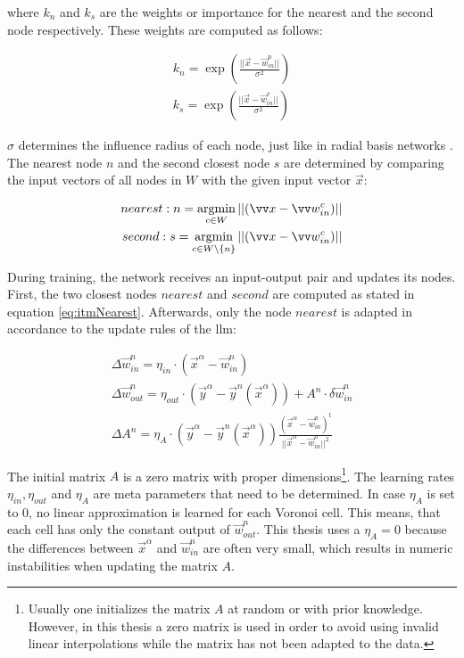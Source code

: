 where $k_n$ and $k_s$ are the weights or importance for the nearest and the second node respectively. These weights are computed as follows:

\begin{equation}
\begin{split}
k_n = \exp\left(\frac{||\vec{x}-\vec{w}^n_{in}||}{\sigma^2}\right) \\
k_s = \exp\left(\frac{||\vec{x}-\vec{w}^s_{in}||}{\sigma^2}\right) 
\end{split}
\end{equation}

$\sigma$ determines the influence radius of each node, just like in radial basis networks \cite{rbf}.
The nearest node $n$ and the second closest node $s$ are determined by comparing the input vectors of all nodes in $W$ with the given input vector $\vec{x}$:

\begin{equation}
\begin{split}
	nearest: n = \argmin_{c \in W} ||(\vec{x} - \vec{w}^c_{in})|| \\
	second: s = \argmin_{c \in W\backslash\{n\}} ||(\vec{x} - \vec{w}^c_{in})||
\end{split}
\label{eq:itmNearest}
\end{equation}

During training, the network receives an input-output pair and updates its nodes. First, the two closest nodes $nearest$ and $second$ are computed as stated in equation \ref{eq:itmNearest}. Afterwards, only the node $nearest$ is adapted in accordance to the update rules of the \gls{llm}:

\begin{equation}
\begin{split}
\Delta \vec{w}^n_{in} = \eta_{in} \cdot (\vec{x}^\alpha - \vec{w}^n_{in}) \\
\Delta \vec{w}^n_{out} = \eta_{out} \cdot (\vec{y}^\alpha - \vec{y}^n(\vec{x}^\alpha)) + A^n \cdot \delta \vec{w}^n_{in} \\
\Delta A^n = \eta_A \cdot (\vec{y}^\alpha - \vec{y}^n(\vec{x}^\alpha)) \frac{(\vec{x}^\alpha - \vec{w}^n_{in})^t}{||\vec{x}^\alpha - \vec{w}^n_{in}||^2}
\end{split}
\end{equation}

The initial matrix $A$ is a zero matrix with proper dimensions\footnote{Usually one initializes the matrix $A$ at random or with prior knowledge. However, in this thesis a zero matrix is used in order to avoid using invalid linear interpolations while the matrix has not been adapted to the data.}. 
The learning rates $\eta_{in}, \eta_{out}$ and $\eta_A$ are meta parameters that need to be determined. In case $\eta_A$ is set to 0, no linear approximation is learned for each Voronoi cell. This means, that each cell has only the constant output of $\vec{w}^n_{out}$. This thesis uses a $\eta_{A} = 0$ because the differences between $\vec{x}^\alpha$ and  $\vec{w}^n_{in}$ are often very small, which results in numeric instabilities when updating the matrix $A$. 

